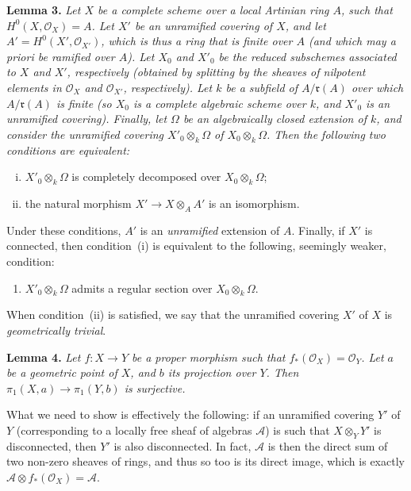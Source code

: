 \documentclass{article}
\newenvironment{itenv}[1]
  {\phantomsection\par\medskip\noindent\textbf{#1.}\itshape}
  {\par\medskip}
\newcommand{\scr}[1]{{\mathscr{#1}}}
\newcommand{\fk}{\mathfrak}
\newcommand{\oldpage}[1]{\marginpar{\footnotesize$\Big\vert$ \textit{p.~#1}}}
\begin{document}
\begin{itenv}{Lemma 3}
\label{lemma3}
  Let $X$ be a complete scheme over a local Artinian ring $A$, such that $H^0(X,\scr{O}_X)=A$.
  Let $X'$ be an unramified covering of $X$, and let $A'=H^0(X',\scr{O}_{X'})$, which is thus a ring that is finite over $A$ (and which may a priori be ramified over $A$).
  Let $X_0$ and $X'_0$ be the reduced subschemes associated to $X$ and $X'$, respectively (obtained by splitting by the sheaves of nilpotent elements in $\scr{O}_X$ and $\scr{O}_{X'}$, respectively).
  Let $k$ be a subfield of $A/\fk{r}(A)$ over which $A/\fk{r}(A)$ is finite (so $X_0$ is a complete algebraic scheme over $k$, and $X'_0$ is an unramified covering).
  Finally, let $\Omega$ be an algebraically closed extension of $k$, and consider the unramified covering $X'_0\otimes_k\Omega$ of $X_0\otimes_k\Omega$.
  Then the following two conditions are equivalent:
\oldpage{182-20}
  \begin{enumerate}[i.]
    \item $X'_0\otimes_k\Omega$ is completely decomposed over $X_0\otimes_k\Omega$;
    \item the natural morphism $X'\to X\otimes_AA'$ is an isomorphism.
  \end{enumerate}

  Under these conditions, $A'$ is an \emph{unramified} extension of $A$.
  Finally, if $X'$ is connected, then condition~(i) is equivalent to the following, seemingly weaker, condition:
  \begin{enumerate}[i bis.]
    \item $X'_0\otimes_k\Omega$ admits a regular section over $X_0\otimes_k\Omega$.
  \end{enumerate}
\end{itenv}

When condition~(ii) is satisfied, we say that the unramified covering $X'$ of $X$ is \emph{geometrically trivial}.

\begin{itenv}{Lemma 4}
\label{lemma4}
  Let $f\colon X\to Y$ be a proper morphism such that $f_*(\scr{O}_X)=\scr{O}_Y$.
  Let $a$ be a geometric point of $X$, and $b$ its projection over $Y$.
  Then $\pi_1(X,a)\to\pi_1(Y,b)$ is \emph{surjective}.
\end{itenv}

What we need to show is effectively the following: if an unramified covering $Y'$ of $Y$ (corresponding to a locally free sheaf of algebras $\scr{A}$) is such that $X\otimes_YY'$ is disconnected, then $Y'$ is also disconnected.
In fact, $\scr{A}$ is then the direct sum of two non-zero sheaves of rings, and thus so too is its direct image, which is exactly $\scr{A}\otimes f_*(\scr{O}_X)=\scr{A}$.
\end{document}
